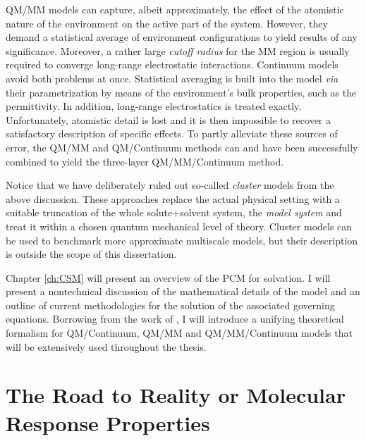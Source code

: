 \acrshort{QM}/\acrshort{MM} models can capture, albeit approximately, the effect
of the atomistic nature of the environment on the active part of the
system.
However, they demand a statistical average of environment configurations
to yield results of any significance. Moreover, a rather large
\emph{cutoff radius} for the \acrshort{MM} region is usually required to converge
long-range electrostatic interactions.\autocite{Steindal2011-ki}
Continuum models avoid both problems at once. Statistical averaging is
built into the model \emph{via} their parametrization by
means of the environment's bulk properties, such as the permittivity.
In addition, long-range electrostatics is treated exactly.
Unfortunately, atomistic detail is lost and it is then impossible to
recover a satisfactory description of specific effects.
To partly alleviate these sources of error, the
\acrshort{QM}/\acrshort{MM} and \acrshort{QM}/Continuum methods can and
have been successfully combined to yield the three-layer
\acrshort{QM}/\acrshort{MM}/Continuum method.\autocite{Steindal2011-ki,
Lipparini2011-rd, Caprasecca2012-ir, Lipparini2013-ud}

Notice that we have deliberately ruled out so-called \emph{cluster}
models from the above discussion.
These approaches replace the actual physical setting with a suitable
truncation of the whole solute+solvent system, the \emph{model system}
and treat it within a chosen quantum mechanical level of theory.
Cluster models can be used to benchmark more approximate multiscale
models, but their description is outside the scope of this dissertation.

Chapter \ref{ch:CSM} will present an overview of the \gls{PCM} for
solvation.
I will present a nontechnical discussion of the mathematical details of
the model and an outline of current methodologies for the solution of
the associated governing equations.
Borrowing from the work of \citeauthor{Lipparini2010-be},\autocite{Lipparini2010-be,
Lipparini2015-lq} I will introduce a unifying theoretical formalism for
\acrshort{QM}/Continuum, \acrshort{QM}/\acrshort{MM} and \acrshort{QM}/\acrshort{MM}/Continuum models that will
be extensively used throughout the thesis.

\section*{The Road to Reality or Molecular Response Properties}

